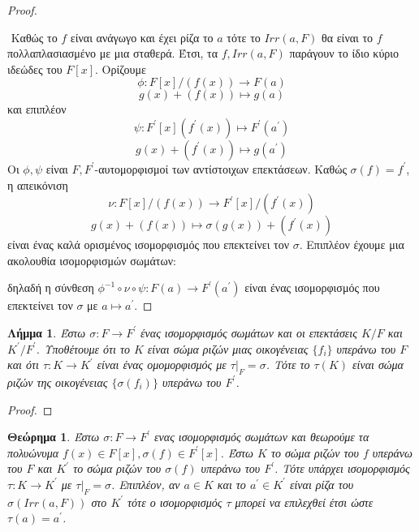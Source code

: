 \documentclass[oneside,a4paper]{article}
\newtheorem{theorem}{Θεώρημα}
\newtheorem{lemma}{Λήμμα}
\begin{document}
\begin{proof} $ $

	$ $\newline
	Καθώς το $f$ είναι ανάγωγο και έχει ρίζα το $a$ τότε το $Irr(a,F)$ θα είναι το $f$ πολλαπλασιασμένο με μια σταθερά. Έτσι, τα $f , Irr(a,F)$ παράγουν το ίδιο κύριο ιδεώδες του $F[x]$. Ορίζουμε
	$$\phi : F[x]/(f(x)) \longrightarrow F(a)$$
	$$g(x) + (f(x)) \longmapsto g(a)$$
	και επιπλέον
	$$\psi : F^{\prime} [x] (f^{\prime}(x)) \longmapsto F^{\prime}(a^{\prime})$$
	$$g(x) + (f^{\prime}(x)) \longmapsto g(a^{\prime})$$
	Οι $\phi, \psi$ είναι $F,F^{\prime}$-αυτομορφισμοί των αντίστοιχων επεκτάσεων. Καθώς $\sigma (f) = f^{\prime}$, η απεικόνιση 
	$$\nu : F[x]/(f(x)) \longrightarrow F^{\prime}[x]/(f^{\prime}(x))$$
	$$g(x) + (f(x)) \longmapsto \sigma(g(x)) + (f^{\prime}(x))$$
	είναι ένας καλά ορισμένος ισομορφισμός που επεκτείνει τον $\sigma$. Επιπλέον έχουμε μια ακολουθία ισομορφισμών σωμάτων:
	\begin{center}
	\end{center}
	δηλαδή η σύνθεση $\phi^{-1} \circ \nu \circ \psi : F(a) \rightarrow F^{\prime}(a^{\prime})$ είναι ένας ισομορφισμός που επεκτείνει τον $\sigma$ με $a \mapsto a^{\prime}$.
\end{proof}

\begin{lemma} Έστω $\sigma : F \rightarrow F^{\prime}$ ένας ισομορφισμός σωμάτων και οι επεκτάσεις $K/F$ και $K^{\prime} / F^{\prime}$. Υποθέτουμε ότι το $K$ είναι σώμα ριζών μιας οικογένειας $\{f_i\}$ υπεράνω του $F$ και ότι $\tau : K \rightarrow K^{\prime}$ είναι ένας ομομορφισμός με $\tau|_F = \sigma$. Τότε το $\tau(K)$ είναι σώμα ριζών της οικογένειας $\{\sigma(f_i) \}$ υπεράνω του $F^{\prime}$.
\end{lemma}

\begin{proof}
\end{proof}

\begin{theorem} %
	Έστω $\sigma : F \rightarrow F^{\prime}$ ενας ισομορφισμός σωμάτων και θεωρούμε τα πολυώνυμα $f(x) \in F[x] , \sigma(f) \in F^{\prime}[x]$. Έστω $K$ το σώμα ριζών του $f$ υπεράνω του $F$ και $K^{\prime}$ το σώμα ριζών του $\sigma (f)$ υπεράνω του $F^{\prime}$. Τότε υπάρχει ισομορφισμός $\tau: K \rightarrow K^{\prime}$ με $\tau|_F = \sigma$. Επιπλέον, αν $a \in K$ και το $a^{\prime} \in K^{\prime}$ είναι ρίζα του $\sigma (Irr(a,F))$ στο $K^{\prime}$ τότε ο ισομορφισμός $\tau$ μπορεί να επιλεχθεί έτσι ώστε $\tau(a) = a^{\prime}$. 
\end{theorem}
\end{document}
